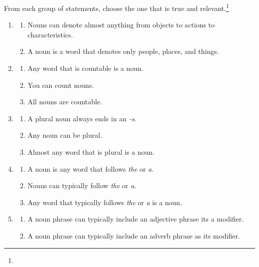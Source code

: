 \begin{tcolorbox}[title=Questions, colback=white]
From each group of statements, choose the one that is true and relevant.\footnote{
}
    \begin{enumerate}[noitemsep]
        \item\begin{enumerate}[noitemsep]
            \item Nouns can denote almost anything from objects to actions to characteristics.
            \item A noun is a word that denotes only people, places, and things.
        \end{enumerate}
        \item\begin{enumerate}[noitemsep]
            \item Any word that is countable is a noun.
            \item You can count nouns.
            \item All nouns are countable.
        \end{enumerate}
        \item\begin{enumerate}[noitemsep]
            \item A plural noun always ends in an \textit{-s}.
            \item Any noun can be plural.
            \item Almost any word that is plural is a noun.
        \end{enumerate}
        \item\begin{enumerate}[noitemsep]
            \item A noun is any word that follows \textit{the} or \textit{a}.
            \item Nouns can typically follow \textit{the} or \textit{a}.
            \item Any word that typically follows \textit{the} or \textit{a} is a noun.
        \end{enumerate}
        \item\begin{enumerate}[noitemsep]
            \item A noun phrase can typically include an adjective phrase its a modifier.
            \item A noun phrase can typically include an adverb phrase as its modifier.

\end{enumerate}
\end{enumerate}
\end{tcolorbox}
